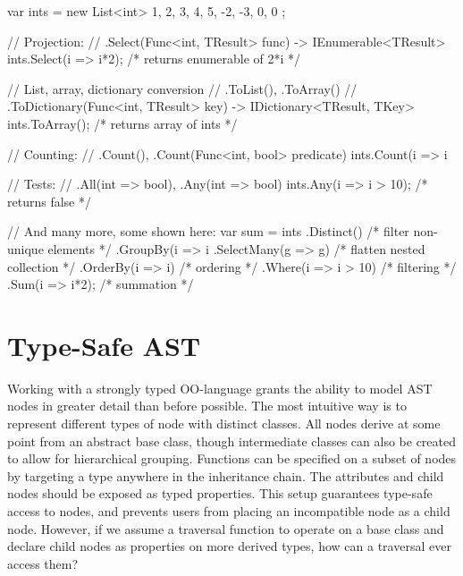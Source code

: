\documentclass[twoside,openright]{uva-bachelor-thesis}
\begin{document}
			\begin{codespan}
				\begin{csharpcode}
					var ints = new List<int> { 1, 2, 3, 4, 5, -2, -3, 0, 0 };
					
					// Projection:
					//   .Select(Func<int, TResult> func) -> IEnumerable<TResult>
					ints.Select(i => i*2);          /* returns enumerable of 2*i */
					
					// List, array, dictionary conversion
					//   .ToList(), .ToArray()
					//   .ToDictionary(Func<int, TResult> key) -> IDictionary<TResult, TKey>
					ints.ToArray();                 /* returns array of ints */
					
					// Counting:
					//   .Count(), .Count(Func<int, bool> predicate)
					ints.Count(i => i %
					
					// Tests:
					//   .All(int => bool), .Any(int => bool)
					ints.Any(i => i > 10);          /* returns false */
					
					// And many more, some shown here:
					var sum = ints
						.Distinct()          /* filter non-unique elements */
						.GroupBy(i => i%
						.SelectMany(g => g)  /* flatten nested collection */
						.OrderBy(i => i)     /* ordering */
						.Where(i => i > 10)  /* filtering */
						.Sum(i => i*2);      /* summation */
				\end{csharpcode}
			\end{codespan}
			
	
	\section{Type-Safe AST}
	\label{type-safe-ast}
		Working with a strongly typed OO-language grants the ability to model AST nodes in greater detail than before possible. The most intuitive way is to represent different types of node with distinct classes. All nodes derive at some point from an abstract base class, though intermediate classes can also be created to allow for hierarchical grouping. Functions can be specified on a subset of nodes by targeting a type anywhere in the inheritance chain. The attributes and child nodes should be exposed as typed properties. This setup guarantees type-safe access to nodes, and prevents users from placing an incompatible node as a child node. However, if we assume a traversal function to operate on a base class and declare child nodes as properties on more derived types, how can a traversal ever access them?
		
\end{document}
